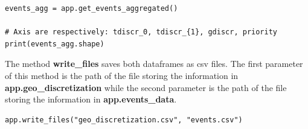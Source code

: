 \documentclass[article]{jss}
\begin{document}
{\begin{lstlisting}[label={list:10},caption=Aggregating events by discretization.]
events_agg = app.get_events_aggregated()

# Axis are respectively: tdiscr_0, tdiscr_{1}, gdiscr, priority
print(events_agg.shape)
\end{lstlisting}

The method \textbf{write\_files} saves both dataframes as csv files. The first parameter of this method is the path of the file storing the information in \textbf{app.geo\_discretization} while the second parameter is the path of the file storing the information in \textbf{app.events\_data}.

\begin{lstlisting}[label={list:10},caption=Writing the discretized data to a file.]
app.write_files("geo_discretization.csv", "events.csv")
\end{lstlisting}
}
\end{document}
